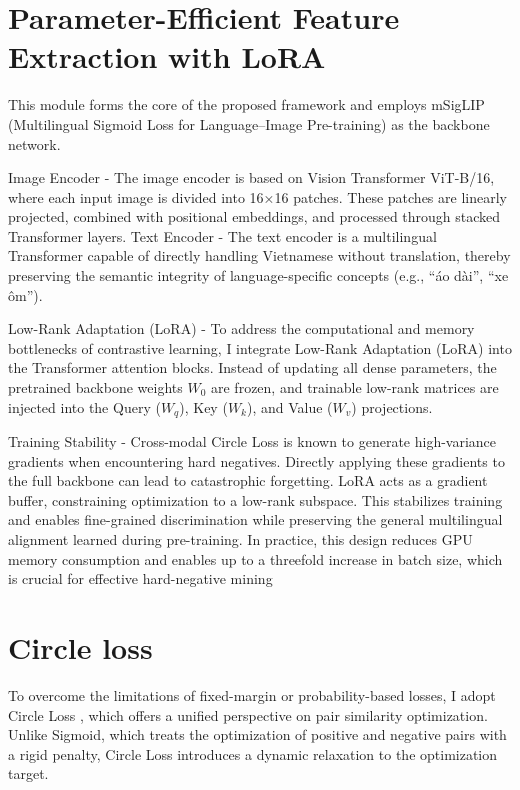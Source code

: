\documentclass[../main.tex]{subfiles}
\begin{document}
\section{Parameter-Efficient Feature Extraction with LoRA}

This module forms the core of the proposed framework and employs mSigLIP (Multilingual Sigmoid Loss for Language–Image Pre-training) as the backbone network.

\noindent Image Encoder - The image encoder is based on Vision Transformer ViT-B/16, where each input image is divided into 16×16 patches. These patches are linearly projected, combined with positional embeddings, and processed through stacked Transformer layers. Text Encoder - The text encoder is a multilingual Transformer capable of directly handling Vietnamese without translation, thereby preserving the semantic integrity of language-specific concepts (e.g., “áo dài”, “xe ôm”).

\noindent Low-Rank Adaptation (LoRA)  - To address the computational and memory bottlenecks of contrastive learning, I integrate Low-Rank Adaptation (LoRA) into the Transformer attention blocks. Instead of updating all dense parameters, the pretrained backbone weights $W_0$ are frozen, and trainable low-rank matrices are injected into the Query ($W_q$), Key ($W_k$), and Value ($W_v$) projections.

\noindent Training Stability - Cross-modal Circle Loss is known to generate high-variance gradients when encountering hard negatives. Directly applying these gradients to the full backbone can lead to catastrophic forgetting. LoRA acts as a gradient buffer, constraining optimization to a low-rank subspace. This stabilizes training and enables fine-grained discrimination while preserving the general multilingual alignment learned during pre-training. In practice, this design reduces GPU memory consumption and enables up to a threefold increase in batch size, which is crucial for effective hard-negative mining

\section{Circle loss}
To overcome the limitations of fixed-margin or probability-based losses, I adopt Circle Loss , which offers a unified perspective on pair similarity optimization. Unlike Sigmoid, which treats the optimization of positive and negative pairs with a rigid penalty, Circle Loss introduces a dynamic relaxation to the optimization target.
\end{document}
